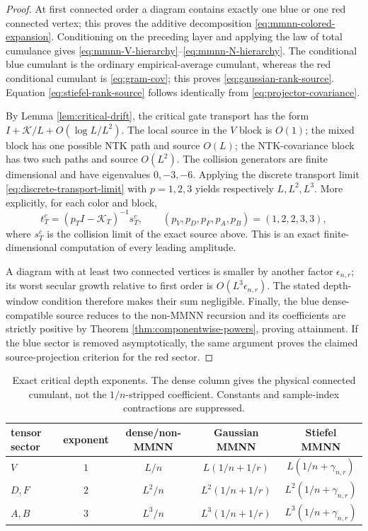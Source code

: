 \documentclass{article}
\begin{document}
\begin{proof}
At first connected order a diagram contains exactly one blue or one red
connected vertex; this proves the additive decomposition
\eqref{eq:mmnn-colored-expansion}.  Conditioning on the preceding layer and
applying the law of total cumulance gives
\eqref{eq:mmnn-V-hierarchy}--\eqref{eq:mmnn-N-hierarchy}.  The conditional
blue cumulant is the ordinary empirical-average cumulant, whereas the red
conditional cumulant is \eqref{eq:gram-cov}; this proves
\eqref{eq:gaussian-rank-source}.  Equation
\eqref{eq:stiefel-rank-source} follows identically from
\eqref{eq:projector-covariance}.

By Lemma \ref{lem:critical-drift}, the critical gate transport has the form
\(I+\mathcal K/L+O(\log L/L^2)\).  The local source in the \(V\) block is
\(O(1)\); the mixed block has one possible NTK path and source \(O(L)\); the
NTK-covariance block has two such paths and source \(O(L^2)\).  The collision
generators are finite dimensional and have eigenvalues \(0,-3,-6\).
Applying the discrete transport limit
\eqref{eq:discrete-transport-limit} with \(p=1,2,3\) yields respectively
\(L,L^2,L^3\).  More explicitly, for each color and block,
\begin{equation}
t_T^c=(p_T I-\mathcal K_T)^{-1}s_T^c,
\qquad
(p_V,p_D,p_F,p_A,p_B)=(1,2,2,3,3),
\label{eq:mmnn-leading-coefficient}
\end{equation}
where \(s_T^c\) is the collision limit of the exact source above.  This is an
exact finite-dimensional computation of every leading amplitude.

A diagram with at least two connected vertices is smaller by another factor
\(\epsilon_{n,r}\); its worst secular growth relative to first order is
\(O(L^3\epsilon_{n,r})\).  The stated depth-window condition therefore makes
their sum negligible.  Finally, the blue dense-compatible source reduces to
the non-MMNN recursion and its coefficients are strictly positive by Theorem
\ref{thm:componentwise-powers}, proving attainment.  If the blue sector is
removed asymptotically, the same argument proves the claimed source-projection
criterion for the red sector.
\end{proof}

\begin{table}[t]
\centering
\caption{Exact critical depth exponents.  The dense column gives the physical
connected cumulant, not the \(1/n\)-stripped coefficient.  Constants and
sample-index contractions are suppressed.}
\label{tab:dense-mmnn-exponents}
\small
\begin{tabular}{lcccc}
\toprule
tensor sector & exponent & dense/non-MMNN & Gaussian MMNN & Stiefel MMNN\\
\midrule
\(V\) & \(1\) & \(L/n\) & \(L(1/n+1/r)\) & \(L(1/n+\gamma_{n,r})\)\\
\(D,F\) & \(2\) & \(L^2/n\) & \(L^2(1/n+1/r)\) & \(L^2(1/n+\gamma_{n,r})\)\\
\(A,B\) & \(3\) & \(L^3/n\) & \(L^3(1/n+1/r)\) & \(L^3(1/n+\gamma_{n,r})\)\\
\bottomrule
\end{tabular}
\end{table}
\end{document}
